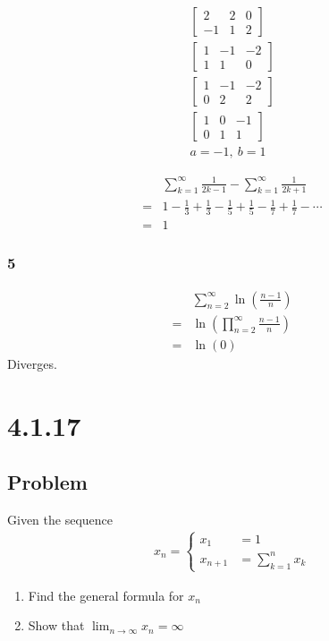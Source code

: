 \documentclass[12pt]{article}
\newcommand{\round}[1]{\left(       #1 \right)      }
\begin{document}
\begin{align*}
    \begin{bmatrix}
        2 & 2 & 0 \\
        -1 & 1 & 2
    \end{bmatrix} \\
    \begin{bmatrix}
        1 & -1 & -2 \\
        1 & 1 & 0
    \end{bmatrix} \\
    \begin{bmatrix}
        1 & -1 & -2 \\
        0 & 2 & 2
    \end{bmatrix} \\
    \begin{bmatrix}
        1 & 0 & -1 \\
        0 & 1 & 1
    \end{bmatrix} \\
    a = -1,\ b = 1
\end{align*}

\begin{align*}
     & \sum_{k=1}^\infty \frac{1}{2k-1} - \sum_{k=1}^\infty \frac{1}{2k+1} \\
    =& 1 - \frac{1}{3} + \frac{1}{3} - \frac{1}{5} + \frac{1}{5} - \frac{1}{7} + \frac{1}{7} - \cdots \\
    =& 1
\end{align*}

\subsubsection*{5}
\begin{align*}
     & \sum_{n=2}^\infty \ln\round{\frac{n-1}{n}} \\
    =& \ln\round{\prod_{n=2}^\infty \frac{n-1}{n}} \\
    =& \ln(0)
\end{align*}
Diverges.



\section*{4.1.17}

\subsection*{Problem}
Given the sequence
\begin{align*}
    x_n = \begin{cases}
        x_1 &= 1 \\
        x_{n + 1} &= \sum_{k = 1}^n x_k
    \end{cases}
\end{align*}
\begin{enumerate}
    \item Find the general formula for $x_n$
    \item Show that $\lim_{n \to \infty} x_n = \infty$
\end{enumerate}
\end{document}
